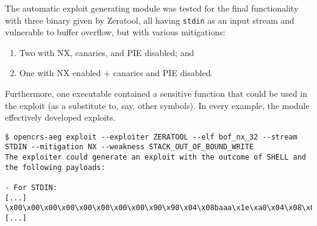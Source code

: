 \documentclass[../main.tex]{subfiles}
\begin{document}
The automatic exploit generating module was tested for the final functionality
with three binary given by Zeratool, all having \texttt{stdin} as an input
stream and vulnerable to buffer overflow, but with various mitigations:

\begin{enumerate}
  \def\labelenumi{\arabic{enumi}.}
  \tightlist
  \item
        Two with NX, canaries, and PIE disabled; and
  \item
        One with NX enabled + canaries and PIE disabled.
\end{enumerate}

Furthermore, one executable contained a sensitive function that could be used
in the exploit (as a substitute to, say, other symbols). In every example, the
module effectively developed exploits.

\begin{tiny}
\begin{verbatim}
$ opencrs-aeg exploit --exploiter ZERATOOL --elf bof_nx_32 --stream STDIN --mitigation NX --weakness STACK_OUT_OF_BOUND_WRITE
The exploiter could generate an exploit with the outcome of SHELL and the following payloads:

- For STDIN:
[...]
\x00\x00\x00\x00\x00\x00\x00\x00\x90\x90\x04\x08baaa\x1e\xa0\x04\x08\x00\x00\x00\x00\x00
[...]
\end{verbatim}
\end{tiny}
\end{document}
